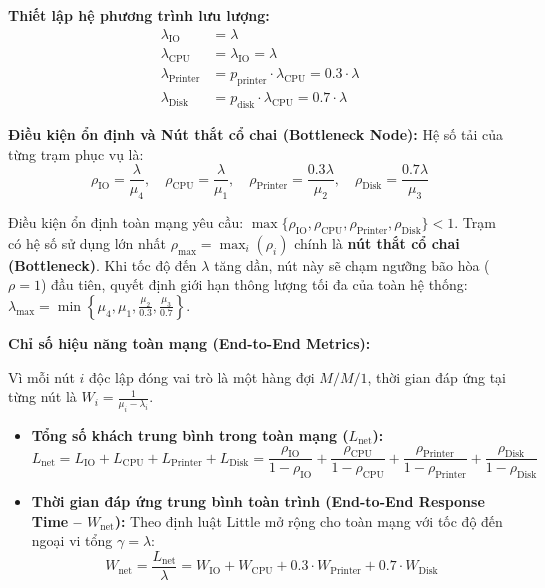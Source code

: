 \textbf{Thiết lập hệ phương trình lưu lượng:}
\begin{align}
    \lambda_{\text{IO}} &= \lambda \\
    \lambda_{\text{CPU}} &= \lambda_{\text{IO}} = \lambda \\
    \lambda_{\text{Printer}} &= p_{\text{printer}} \cdot \lambda_{\text{CPU}} = 0.3 \cdot \lambda \\
    \lambda_{\text{Disk}} &= p_{\text{disk}} \cdot \lambda_{\text{CPU}} = 0.7 \cdot \lambda
\end{align}

\textbf{Điều kiện ổn định và Nút thắt cổ chai (Bottleneck Node):}
Hệ số tải của từng trạm phục vụ là:
\begin{equation}
    \rho_{\text{IO}} = \frac{\lambda}{\mu_4}, \quad \rho_{\text{CPU}} = \frac{\lambda}{\mu_1}, \quad \rho_{\text{Printer}} = \frac{0.3\lambda}{\mu_2}, \quad \rho_{\text{Disk}} = \frac{0.7\lambda}{\mu_3}
\end{equation}

Điều kiện ổn định toàn mạng yêu cầu: $\max\{\rho_{\text{IO}}, \rho_{\text{CPU}}, \rho_{\text{Printer}}, \rho_{\text{Disk}}\} < 1$.
Trạm có hệ số sử dụng lớn nhất $\rho_{\max} = \max_i (\rho_i)$ chính là \textbf{nút thắt cổ chai (Bottleneck)}. Khi tốc độ đến $\lambda$ tăng dần, nút này sẽ chạm ngưỡng bão hòa ($\rho = 1$) đầu tiên, quyết định giới hạn thông lượng tối đa của toàn hệ thống: $\lambda_{\max} = \min\left\{\mu_4, \mu_1, \frac{\mu_2}{0.3}, \frac{\mu_3}{0.7}\right\}$.

\textbf{Chỉ số hiệu năng toàn mạng (End-to-End Metrics):}

Vì mỗi nút $i$ độc lập đóng vai trò là một hàng đợi $M/M/1$, thời gian đáp ứng tại từng nút là $W_i = \frac{1}{\mu_i - \lambda_i}$.
\begin{itemize}[leftmargin=1.5em]
    \item \textbf{Tổng số khách trung bình trong toàn mạng ($L_{\text{net}}$):}
    \begin{equation}
        L_{\text{net}} = L_{\text{IO}} + L_{\text{CPU}} + L_{\text{Printer}} + L_{\text{Disk}} = \frac{\rho_{\text{IO}}}{1 - \rho_{\text{IO}}} + \frac{\rho_{\text{CPU}}}{1 - \rho_{\text{CPU}}} + \frac{\rho_{\text{Printer}}}{1 - \rho_{\text{Printer}}} + \frac{\rho_{\text{Disk}}}{1 - \rho_{\text{Disk}}}
    \end{equation}
    
    \item \textbf{Thời gian đáp ứng trung bình toàn trình (End-to-End Response Time -- $W_{\text{net}}$):}
    Theo định luật Little mở rộng cho toàn mạng với tốc độ đến ngoại vi tổng $\gamma = \lambda$:
    \begin{equation}
        W_{\text{net}} = \frac{L_{\text{net}}}{\lambda} = W_{\text{IO}} + W_{\text{CPU}} + 0.3 \cdot W_{\text{Printer}} + 0.7 \cdot W_{\text{Disk}}
    \end{equation}
\end{itemize}

